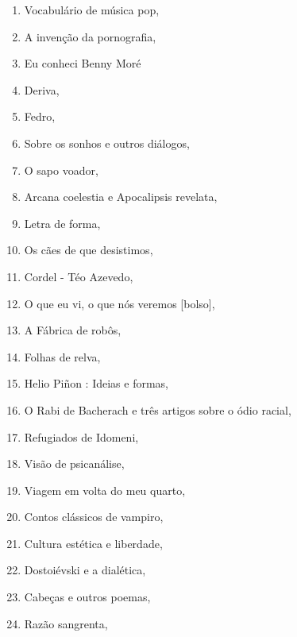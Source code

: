 \begin{multicols}{2}
\begin{enumerate}
\item Vocabulário de música pop, {}
\item A invenção da pornografia, {}
\item Eu conheci Benny Moré
\item Deriva, {}
\item Fedro, {}
\item Sobre os sonhos e outros diálogos, {}
\item O sapo voador, {}
\item Arcana coelestia e Apocalipsis revelata, {}
\item Letra de forma, {}
\item Os cães de que desistimos, {}
\item Cordel - Téo Azevedo, {}
\item O que eu vi, o que nós veremos [bolso], {}
\item A Fábrica de robôs, {}
\item Folhas de relva, {}
\item Helio Piñon : Ideias e formas, {}
\item O Rabi de Bacherach e três artigos sobre o ódio racial, {}
\item Refugiados de Idomeni, {}
\item Visão de psicanálise, {}
\item Viagem em volta do meu quarto, {}
\item Contos clássicos de vampiro, {}
\item Cultura estética e liberdade, {}
\item Dostoiévski e a dialética, {}
\item Cabeças e outros poemas, {}
\item Razão sangrenta, {}

\end{enumerate}
\end{multicols}
